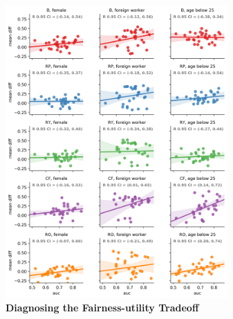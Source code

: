 \documentclass{acm_proc_article-sp}
\begin{document}
\begin{figure}[h]
\centering
\includegraphics[width=8.5cm]{IMG/fairness_utility_tradeoff.png}
\caption{
  \textbf{Diagnosing the Fairness-utility Tradeoff}
  }
\label{figure-2-fairness-utility-tradeoff}
\end{figure}


\end{document}
